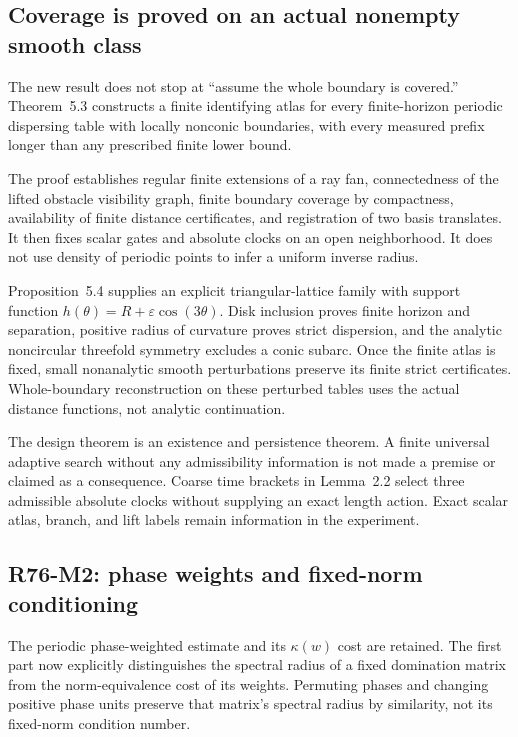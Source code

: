 \documentclass[
  11pt,
]{article}
\begin{document}
\subsection{Coverage is proved on an actual nonempty smooth
class}\label{coverage-is-proved-on-an-actual-nonempty-smooth-class}

The new result does not stop at ``assume the whole boundary is
covered.'' Theorem~5.3 constructs a finite identifying
atlas for every finite-horizon periodic dispersing table with locally
nonconic boundaries, with every measured prefix longer than any
prescribed finite lower bound.

The proof establishes regular finite extensions of a ray fan,
connectedness of the lifted obstacle visibility graph, finite boundary
coverage by compactness, availability of finite distance certificates,
and registration of two basis translates. It then fixes scalar gates and
absolute clocks on an open neighborhood. It does not use density of
periodic points to infer a uniform inverse radius.

Proposition~5.4 supplies an explicit triangular-lattice family
with support function \(h(\theta)=R+\varepsilon\cos(3\theta)\). Disk
inclusion proves finite horizon and separation, positive radius of
curvature proves strict dispersion, and the analytic noncircular
threefold symmetry excludes a conic subarc. Once the finite atlas is
fixed, small nonanalytic smooth perturbations preserve its finite strict
certificates. Whole-boundary reconstruction on these perturbed tables
uses the actual distance functions, not analytic continuation.

The design theorem is an existence and persistence theorem. A finite
universal adaptive search without any admissibility information is not
made a premise or claimed as a consequence. Coarse time brackets in
Lemma~2.2 select three admissible absolute clocks
without supplying an exact length action. Exact scalar atlas, branch,
and lift labels remain information in the experiment.

\subsection{R76-M2: phase weights and fixed-norm
conditioning}\label{r76-m2-phase-weights-and-fixed-norm-conditioning}

The periodic phase-weighted estimate and its \(\kappa(w)\) cost are
retained. The first part now explicitly distinguishes the spectral
radius of a fixed domination matrix from the norm-equivalence cost of
its weights. Permuting phases and changing positive phase units preserve
that matrix's spectral radius by similarity, not its fixed-norm
condition number.
\end{document}
